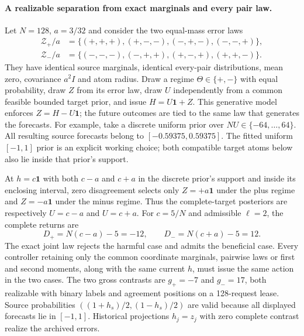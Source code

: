 \documentclass[10pt]{article}
\begin{document}
\paragraph{A realizable separation from exact marginals and every pair law.}
Let $N=128$, $a=3/32$ and consider the two equal-mass error laws
\begin{equation}
\begin{aligned}
 \mathcal Z_+/a&=\{(+,+,+),(+,-,-),(-,+,-),(-,-,+)\},\\
 \mathcal Z_-/a&=\{(-,-,-),(-,+,+),(+,-,+),(+,+,-)\}.
\end{aligned}
\label{eq:conditional-parity-laws}
\end{equation}
They have identical source marginals, identical every-pair distributions,
mean zero, covariance $a^2I$ and atom radius.  Draw a regime
$\Theta\in\{+,-\}$ with equal probability, draw $Z$ from its error law,
draw $U$ independently from a common feasible bounded target prior, and issue
$H=U\mathbf1+Z$.  This generative model enforces $Z=H-U\mathbf1$;
the future outcomes are tied to the same law that generates the forecasts.
For example, take a discrete uniform prior over $NU\in\{-64,\ldots,64\}$.
All resulting source forecasts belong to $[-0.59375,0.59375]$.
The fitted uniform $[-1,1]$ prior is an explicit working choice; both
compatible target atoms below also lie inside that prior's support.

At $h=c\mathbf1$ with both $c-a$ and $c+a$ in the discrete prior's support
and inside its enclosing interval, zero disagreement
selects only $Z=+a\mathbf1$ under the plus regime and
$Z=-a\mathbf1$ under the minus regime.  Thus the complete-target posteriors
are respectively $U=c-a$ and $U=c+a$.  For $c=5/N$ and admissible
$\ell=2$, the complete returns are
\begin{equation}
 D_+=N(c-a)-5=-12,\qquad D_-=N(c+a)-5=12.
 \label{eq:conditional-parity-paid-separation}
\end{equation}
The exact joint law rejects the harmful case and admits the beneficial case.
Every controller retaining only the common coordinate marginals, pairwise
laws or first and second moments, along with the same current $h$, must
issue the same action in the two cases.  The two gross contrasts are
$g_+=-7$ and $g_-=17$, both realizable with binary labels and agreement
positions on a 128-request lease.  Source probabilities
$((1+h_s)/2,(1-h_s)/2)$ are valid because all displayed forecasts lie in
$[-1,1]$.  Historical projections $h_j=z_j$ with zero complete contrast
realize the archived errors.
\end{document}
